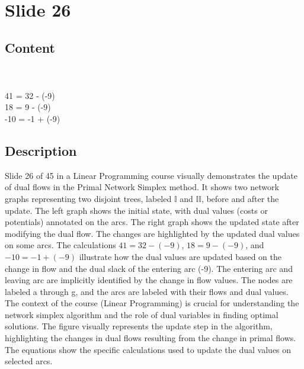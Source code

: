 \documentclass{article}%
\begin{document}
%
\newpage%
\section{Slide 26}%
\label{sec:Slide26}%
\subsection{Content}%

\underline{} \\
\underline{} \\
41 = 32 - (-9) \\
18 = 9 - (-9) \\
-10 = -1 + (-9)
%
\subsection{Description}%
Slide 26 of 45 in a Linear Programming course visually demonstrates the update of dual flows in the Primal Network Simplex method.  It shows two network graphs representing two disjoint trees, labeled $\mathbb{I}$ and $\mathbb{II}$, before and after the update.  The left graph shows the initial state, with dual values (costs or potentials) annotated on the arcs. The right graph shows the updated state after modifying the dual flow.  The changes are highlighted by the updated dual values on some arcs.  The calculations $41 = 32 - (-9)$, $18 = 9 - (-9)$, and $-10 = -1 + (-9)$ illustrate how the dual values are updated based on the change in flow and the dual slack of the entering arc (-9).  The entering arc and leaving arc are implicitly identified by the change in flow values.  The nodes are labeled a through g, and the arcs are labeled with their flows and dual values.  The context of the course (Linear Programming) is crucial for understanding the network simplex algorithm and the role of dual variables in finding optimal solutions. The figure visually represents the update step in the algorithm, highlighting the changes in dual flows resulting from the change in primal flows. The equations show the specific calculations used to update the dual values on selected arcs.%
\end{document}
